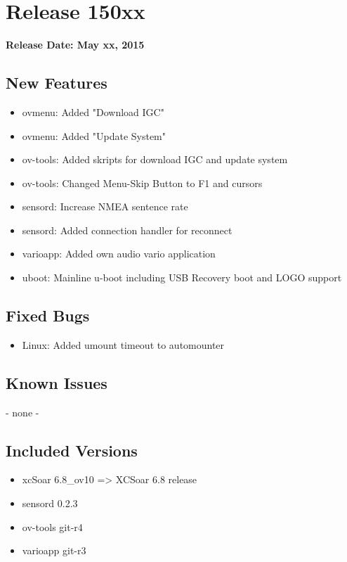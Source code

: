 \chapter*{Release 150xx}

\begin{flushleft}
	\textbf{Release Date: May xx, 2015}
\end{flushleft}

\section*{New Features}

\begin{itemize}
	\item ovmenu: Added "Download IGC"
	\item ovmenu: Added "Update System"
	\item ov-tools: Added skripts for download IGC and update system
	\item ov-tools: Changed Menu-Skip Button to F1 and cursors
	\item sensord: Increase NMEA sentence rate
	\item sensord: Added connection handler for reconnect
	\item varioapp: Added own audio vario application
	\item uboot: Mainline u-boot including USB Recovery boot and LOGO support
\end{itemize}

\section*{Fixed Bugs}
\begin{itemize}
	\item Linux: Added umount timeout to automounter
\end{itemize}

\section*{Known Issues}
	- none -

\section*{Included Versions}

\begin{itemize}
	\item xcSoar 6.8\_ov10 => XCSoar 6.8 release
	\item sensord 0.2.3
	\item ov-tools git-r4
	\item varioapp git-r3
\end{itemize}